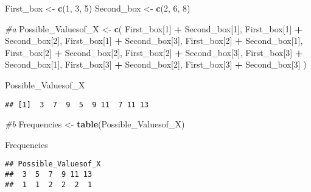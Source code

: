 \documentclass[
]{article}
\newenvironment{Shaded}{\begin{snugshade}}{\end{snugshade}}
\newcommand{\CommentTok}[1]{\textcolor[rgb]{0.56,0.35,0.01}{\textit{#1}}}
\newcommand{\DecValTok}[1]{\textcolor[rgb]{0.00,0.00,0.81}{#1}}
\newcommand{\FunctionTok}[1]{\textcolor[rgb]{0.13,0.29,0.53}{\textbf{#1}}}
\newcommand{\NormalTok}[1]{#1}
\newcommand{\OtherTok}[1]{\textcolor[rgb]{0.56,0.35,0.01}{#1}}
\newcommand{\SpecialCharTok}[1]{\textcolor[rgb]{0.81,0.36,0.00}{\textbf{#1}}}
\begin{document}
\begin{Shaded}
\begin{Highlighting}[]
\NormalTok{First\_box }\OtherTok{\textless{}{-}} \FunctionTok{c}\NormalTok{(}\DecValTok{1}\NormalTok{, }\DecValTok{3}\NormalTok{, }\DecValTok{5}\NormalTok{)}
\NormalTok{Second\_box }\OtherTok{\textless{}{-}} \FunctionTok{c}\NormalTok{(}\DecValTok{2}\NormalTok{, }\DecValTok{6}\NormalTok{, }\DecValTok{8}\NormalTok{)}

\CommentTok{\#a}
\NormalTok{Possible\_Valuesof\_X }\OtherTok{\textless{}{-}} \FunctionTok{c}\NormalTok{(}
\NormalTok{  First\_box[}\DecValTok{1}\NormalTok{] }\SpecialCharTok{+}\NormalTok{ Second\_box[}\DecValTok{1}\NormalTok{], First\_box[}\DecValTok{1}\NormalTok{] }\SpecialCharTok{+}\NormalTok{ Second\_box[}\DecValTok{2}\NormalTok{], First\_box[}\DecValTok{1}\NormalTok{] }\SpecialCharTok{+}\NormalTok{ Second\_box[}\DecValTok{3}\NormalTok{],}
\NormalTok{  First\_box[}\DecValTok{2}\NormalTok{] }\SpecialCharTok{+}\NormalTok{ Second\_box[}\DecValTok{1}\NormalTok{], First\_box[}\DecValTok{2}\NormalTok{] }\SpecialCharTok{+}\NormalTok{ Second\_box[}\DecValTok{2}\NormalTok{], First\_box[}\DecValTok{2}\NormalTok{] }\SpecialCharTok{+}\NormalTok{ Second\_box[}\DecValTok{3}\NormalTok{],}
\NormalTok{  First\_box[}\DecValTok{3}\NormalTok{] }\SpecialCharTok{+}\NormalTok{ Second\_box[}\DecValTok{1}\NormalTok{], First\_box[}\DecValTok{3}\NormalTok{] }\SpecialCharTok{+}\NormalTok{ Second\_box[}\DecValTok{2}\NormalTok{], First\_box[}\DecValTok{3}\NormalTok{] }\SpecialCharTok{+}\NormalTok{ Second\_box[}\DecValTok{3}\NormalTok{]}
\NormalTok{)}

\NormalTok{Possible\_Valuesof\_X}
\end{Highlighting}
\end{Shaded}

\begin{verbatim}
## [1]  3  7  9  5  9 11  7 11 13
\end{verbatim}

\begin{Shaded}
\begin{Highlighting}[]
\CommentTok{\#b}
\NormalTok{Frequencies }\OtherTok{\textless{}{-}} \FunctionTok{table}\NormalTok{(Possible\_Valuesof\_X)}

\NormalTok{Frequencies}
\end{Highlighting}
\end{Shaded}

\begin{verbatim}
## Possible_Valuesof_X
##  3  5  7  9 11 13 
##  1  1  2  2  2  1
\end{verbatim}
\end{document}
